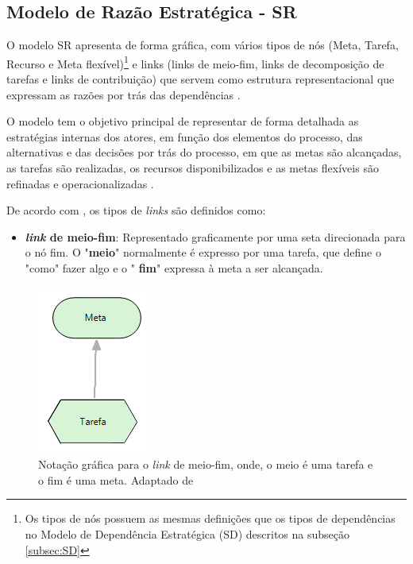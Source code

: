 \subsection{Modelo de Razão Estratégica - SR}
\label{subsec:SR}

O modelo SR apresenta de forma gráfica, com vários tipos de nós (Meta, Tarefa, Recurso e Meta flexível)\footnote[1]{Os tipos de nós possuem as mesmas definições que os tipos de dependências no Modelo de Dependência Estratégica (SD) descritos na subseção \ref{subsec:SD}} e links (links de meio-fim, links de decomposição de tarefas e links de contribuição) que servem como estrutura representacional que expressam as razões por trás das dependências \cite{istarwiki20}.

O modelo tem o objetivo principal de representar de forma detalhada as estratégias internas dos atores, em função dos elementos do processo, das alternativas e das decisões por trás do processo, em que as metas são alcançadas, as tarefas são realizadas, os recursos disponibilizados e as metas flexíveis são refinadas e operacionalizadas \cite{napolitano2009estrategia}.  

De acordo com \cite{istarwiki20}, os tipos de \textit{links} são definidos como: 

\pagebreak

\begin{itemize}
	\item \textbf{\textit{link} de meio-fim}: Representado graficamente por uma seta direcionada para o nó fim. O "\textbf{meio}" normalmente é expresso por uma tarefa, que define o "como" fazer algo e o " \textbf{fim}" expressa à meta a ser alcançada.
\end{itemize}

\begin{figure}[h!]
	\centering
	\includegraphics[keepaspectratio=true,scale=0.9]{figuras/meioFim.PNG}
	\caption{Notação gráfica para o \textit{link} de meio-fim, onde, o meio é uma tarefa e o fim é uma meta. Adaptado de \cite{istarwiki20}}
	\label{meiofim}
\end{figure} 

